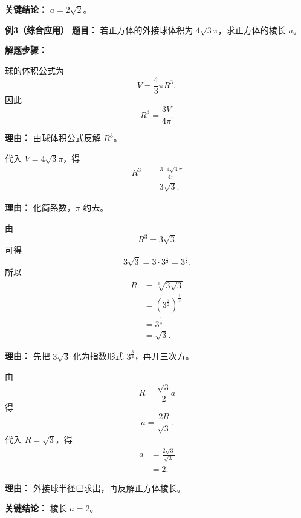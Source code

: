 \begin{examplebox}
	\textbf{\textcolor{CExample}{关键结论：}} $a=2\sqrt{2}$。

	\medskip
	\textbf{\textcolor{CExample}{例3（综合应用）}}
	\textbf{\textcolor{CExample}{题目：}} 若正方体的外接球体积为 $4\sqrt{3}\pi$，求正方体的棱长 $a$。

	\textbf{\textcolor{CExample}{解题步骤：}}

	\begin{description}[style=nextline, leftmargin=2.8em, labelsep=0.5em, itemsep=0.45em]
		\item[\textbf{第一步（写体积关系）：}]
		      球的体积公式为
		      \[
			      V=\frac{4}{3}\pi R^3,
		      \]
		      因此
		      \[
			      R^3=\frac{3V}{4\pi}.
		      \]
		      \par\textbf{理由：} 由球体积公式反解 $R^3$。

		\item[\textbf{第二步（代入体积值）：}]
		      代入 $V=4\sqrt{3}\pi$，得
		      \[
			      \begin{aligned}
				      R^3
				       & =\frac{3\cdot 4\sqrt{3}\pi}{4\pi} \\
				       & =3\sqrt{3}.
			      \end{aligned}
		      \]
		      \par\textbf{理由：} 化简系数，$\pi$ 约去。

		\item[\textbf{第三步（求半径 $R$）：}]
		      由
		      \[
			      R^3=3\sqrt{3}
		      \]
		      可得
		      \[
			      3\sqrt{3}=3\cdot 3^{\frac12}=3^{\frac32}.
		      \]
		      所以
		      \[
			      \begin{aligned}
				      R
				       & =\sqrt[3]{3\sqrt{3}}                \\
				       & =\left(3^{\frac32}\right)^{\frac13} \\
				       & =3^{\frac12}                        \\
				       & =\sqrt{3}.
			      \end{aligned}
		      \]
		      \par\textbf{理由：} 先把 $3\sqrt{3}$ 化为指数形式 $3^{\frac32}$，再开三次方。

		\item[\textbf{第四步（利用半径求棱长）：}]
		      由
		      \[
			      R=\frac{\sqrt{3}}{2}a
		      \]
		      得
		      \[
			      a=\frac{2R}{\sqrt{3}}.
		      \]
		      代入 $R=\sqrt{3}$，得
		      \[
			      \begin{aligned}
				      a
				       & =\frac{2\sqrt{3}}{\sqrt{3}} \\
				       & =2.
			      \end{aligned}
		      \]
		      \par\textbf{理由：} 外接球半径已求出，再反解正方体棱长。
	\end{description}

	\textbf{\textcolor{CExample}{关键结论：}} 棱长 $a=2$。
\end{examplebox}